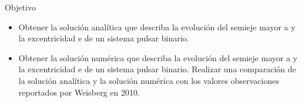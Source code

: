 \begin{frame}{Objetivo}
    \begin{itemize}
    \item Obtener la solución analítica que describa la evolución del semieje mayor a
    y la excentricidad e de un sistema pulsar binario.
    \item Obtener la solución numérica que describa la evolución del semieje mayor
    a y la excentricidad e de un sistema pulsar binario.
    Realizar una comparación de la solución analítica y la solución numérica
    con los valores observaciones reportados por Weisberg en 2010. 
\end{itemize}
\end{frame}